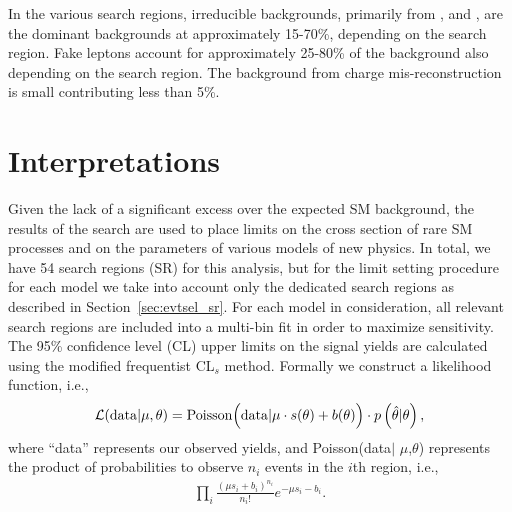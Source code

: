 In the various search regions, irreducible backgrounds, primarily from \ttW,
\WZ and \qqWW, are the dominant backgrounds at approximately 15-70\%, depending
on the search region. Fake leptons account for approximately 25-80\% of the
background also depending on the search region. The background from charge
mis-reconstruction is small contributing less than 5\%.
\clearpage

\section{Interpretations}
\label {sec:results_int}
Given the lack of a significant excess over the expected SM background, the
results of the search are used to place limits on the cross section of rare SM
processes and on the parameters of various models of new physics. In total,
we have 54 search regions (SR) for this analysis, but for the limit setting
procedure for each model we take into account only the dedicated search regions
as described in Section~\ref{sec:evtsel_sr}. For each model in consideration,
all relevant search regions are included into a multi-bin fit in order to
maximize sensitivity. The 95\% confidence level (CL) upper limits on the signal
yields are calculated using the modified frequentist CL$_s$ method. Formally we
construct a likelihood function, i.e.,
\begin{eqnarray}\label{eq:likelihood}
\mathcal{L} ({\rm data}|\mu,\theta) = {\rm Poisson } \Bigl({\rm data}|\mu \cdot s(\theta) + b(\theta)\Bigr) \cdot p\left(\hat{\theta}|\theta\right),
\end{eqnarray}
where ``data'' represents our observed yields, and Poisson(data$|$
$\mu$,$\theta$) represents the product of probabilities to observe $n_i$ events
in the $i$th region, i.e.,
\begin{eqnarray}
\prod_i \frac{ \left(\mu s_i + b_i\right)^{n_i}}{n_i!} e^{-\mu s_i-b_i}.
\end{eqnarray}
